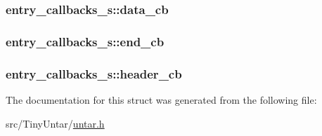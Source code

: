 \subsubsection[{\texorpdfstring{data\+\_\+cb}{data_cb}}]{ entry\+\_\+callbacks\+\_\+s\+::data\+\_\+cb}\hypertarget{structentry__callbacks__s_a52f309045c5324b2ef4d46e95f586043}{}\label{structentry__callbacks__s_a52f309045c5324b2ef4d46e95f586043}
\subsubsection[{\texorpdfstring{end\+\_\+cb}{end_cb}}]{ entry\+\_\+callbacks\+\_\+s\+::end\+\_\+cb}\hypertarget{structentry__callbacks__s_abe7ed69246927a746f4a257fa07211b0}{}\label{structentry__callbacks__s_abe7ed69246927a746f4a257fa07211b0}
\subsubsection[{\texorpdfstring{header\+\_\+cb}{header_cb}}]{ entry\+\_\+callbacks\+\_\+s\+::header\+\_\+cb}\hypertarget{structentry__callbacks__s_a8178d65eecc3afea86f1c65bd8952e96}{}\label{structentry__callbacks__s_a8178d65eecc3afea86f1c65bd8952e96}


The documentation for this struct was generated from the following file\+:\begin{DoxyCompactItemize}
\item 
src/\+Tiny\+Untar/\hyperlink{untar_8h}{untar.\+h}\end{DoxyCompactItemize}
